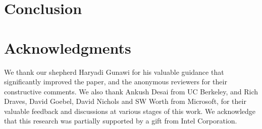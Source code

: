 \documentclass[letterpaper,twocolumn,10pt]{article}
\begin{document}


\vspace{-1mm}
\section{Conclusion}
\label{sec:conclusion}



\vspace{-1mm}
\section{Acknowledgments}

We thank our shepherd Haryadi Gunawi for his valuable guidance that significantly improved the paper, and the anonymous reviewers for their constructive comments. We also thank Ankush Desai from UC Berkeley, and Rich Draves, David Goebel, David Nichols and SW Worth from Microsoft, for their valuable feedback and discussions at various stages of this work. We acknowledge that this research was partially supported by a gift from Intel Corporation.

\balance

{\footnotesize 
}
\end{document}
